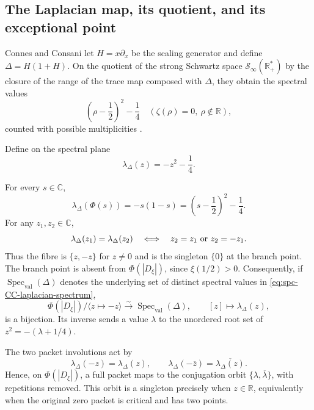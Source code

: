 \subsection{The Laplacian map, its quotient, and its exceptional point}

Connes and Consani let \(H=x\partial_x\) be the scaling generator and define
\(\Delta=H(1+H)\).  On the quotient of the strong Schwartz space
\(\mathcal S_\infty(\mathbb R_+^*)\) by the closure of the range of the
trace map composed with \(\Delta\), they obtain the spectral values
\begin{equation}
\label{eq:spc-CC-laplacian-spectrum}
 \left(\rho-\frac12\right)^2-\frac14
 \quad
 (\zeta(\rho)=0,\ \rho\notin\mathbb R),
\end{equation}
counted with possible multiplicities
\cite[Prop.~4.2]{connesConsani2023Hochschild}.

Define on the spectral plane
\begin{equation}
\label{eq:spc-laplacian-coordinate}
 \lambda_\Delta(z)=-z^2-\frac14.
\end{equation}

\begin{proposition}
\label{prop:spc-laplacian-fibres}
For every \(s\in\mathbb C\),
\begin{equation}
\label{eq:spc-laplacian-affine-identity}
 \lambda_\Delta(\Phi(s))
 =
 -s(1-s)
 =
 \left(s-\frac12\right)^2-\frac14.
\end{equation}
For any \(z_1,z_2\in\mathbb C\),
\begin{equation}
\label{eq:spc-laplacian-fibre-equivalence}
 \lambda_\Delta(z_1)=\lambda_\Delta(z_2)
 \quad\Longleftrightarrow\quad
 z_2=z_1\ \hbox{or}\ z_2=-z_1.
\end{equation}
Thus the fibre is \(\{z,-z\}\) for \(z\ne0\) and is the singleton
\(\{0\}\) at the branch point.  The branch point is absent from
\(\Phi(|D_\xi|)\), since \(\xi(1/2)>0\).  Consequently, if
\(\operatorname{Spec}_{\mathrm{val}}(\Delta)\) denotes the underlying set
of distinct spectral values in \eqref{eq:spc-CC-laplacian-spectrum},
\begin{equation}
\label{eq:spc-sign-quotient-spectrum-bijection}
 \Phi(|D_\xi|)/\langle z\mapsto-z\rangle
 \overset{\sim}{\longrightarrow}
 \operatorname{Spec}_{\mathrm{val}}(\Delta),
 \qquad
 [z]\longmapsto\lambda_\Delta(z),
\end{equation}
is a bijection.  Its inverse sends a value \(\lambda\)
to the unordered root set of
\(z^2=-(\lambda+1/4)\).

The two packet involutions act by
\begin{equation}
\label{eq:spc-laplacian-involutions}
 \lambda_\Delta(-z)=\lambda_\Delta(z),
 \qquad
 \lambda_\Delta(-\overline z)=
 \overline{\lambda_\Delta(z)}.
\end{equation}
Hence, on \(\Phi(|D_\xi|)\), a full packet maps to the conjugation orbit
\(\{\lambda,\overline\lambda\}\), with repetitions removed.  This orbit
is a singleton precisely when \(z\in\mathbb R\), equivalently when the
original zero packet is critical and has two points.
\end{proposition}

